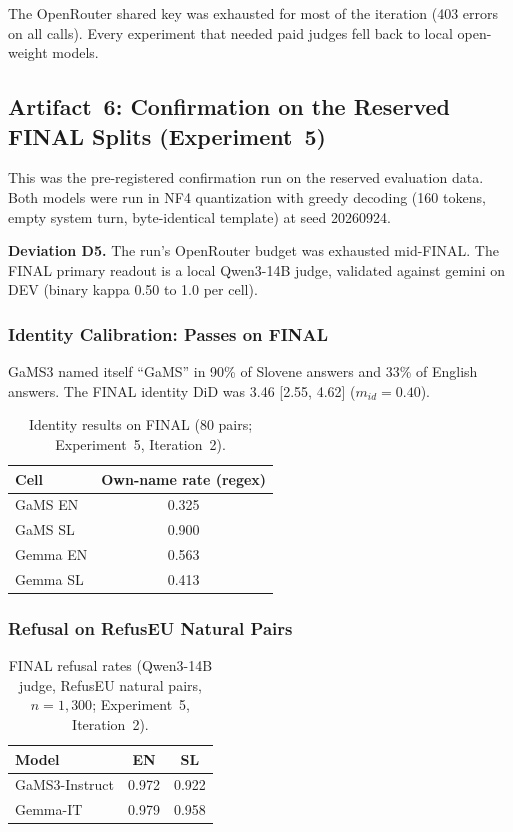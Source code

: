 \documentclass[11pt,letterpaper]{article}
\begin{document}
The OpenRouter shared key was exhausted for most of the iteration (403 errors on all calls). Every experiment that needed paid judges fell back to local open-weight models.

\subsection{Artifact~6: Confirmation on the Reserved FINAL Splits (Experiment~5)}
\label{gen_art_experiment_5}

This was the pre-registered confirmation run on the reserved evaluation data. Both models were run in NF4 quantization with greedy decoding (160 tokens, empty system turn, byte-identical template) at seed 20260924.

\textbf{Deviation D5.} The run's OpenRouter budget was exhausted mid-FINAL. The FINAL primary readout is a local Qwen3-14B judge, validated against gemini on DEV (binary kappa 0.50 to 1.0 per cell).

\subsubsection{Identity Calibration: Passes on FINAL}

GaMS3 named itself ``GaMS'' in 90\% of Slovene answers and 33\% of English answers. The FINAL identity DiD was 3.46 [2.55, 4.62] ($m_{id} = 0.40$).

\begin{table}[!htbp]
\centering
\caption{Identity results on FINAL (80 pairs; Experiment~5, Iteration~2).}
\label{tab:identity_final}
\begin{tabular}{lc}
\toprule
Cell & Own-name rate (regex) \\
\midrule
GaMS EN & 0.325 \\
GaMS SL & 0.900 \\
Gemma EN & 0.563 \\
Gemma SL & 0.413 \\
\bottomrule
\end{tabular}
\end{table}

\subsubsection{Refusal on RefusEU Natural Pairs}

\begin{table}[!htbp]
\centering
\caption{FINAL refusal rates (Qwen3-14B judge, RefusEU natural pairs, $n = 1{,}300$; Experiment~5, Iteration~2).}
\label{tab:final_refusal}
\begin{tabular}{lcc}
\toprule
Model & EN & SL \\
\midrule
GaMS3-Instruct & 0.972 & 0.922 \\
Gemma-IT & 0.979 & 0.958 \\
\bottomrule
\end{tabular}
\end{table}
\end{document}
